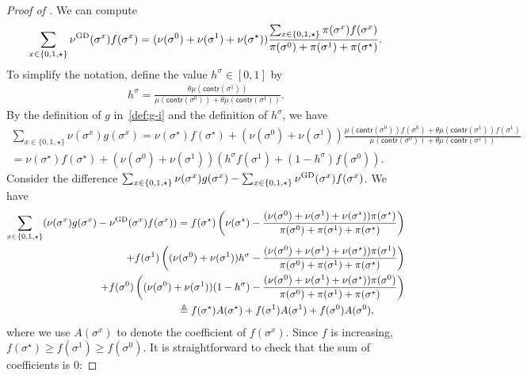 \documentclass[11pt,a4paper]{article}
\theoremstyle{definition}
\newcommand{\defeq}{\triangleq}
\newcommand{\nug}{\nu^{\textnormal{GD}}}
\begin{document}
\begin{proof}[Proof of ]
We can compute
\begin{align*}
\sum_{x\in \{0,1,\star\}}\nug(\sigma^x) f(\sigma^x) =(\nu(\sigma^0)+\nu(\sigma^1)+\nu(\sigma^\star))\frac{\sum_{x\in \{0,1,\star\}}\pi(\sigma^x)f(\sigma^x)}{\pi(\sigma^0)+\pi(\sigma^1)+\pi(\sigma^\star)}.
\end{align*}
To simplify the notation, define the value $h^\sigma \in [0,1]$ by
\begin{align}\label{def:h-sigma}
h^\sigma =\frac{ \theta \mu(\textsf{contr}(\sigma^1))}{\mu(\textsf{contr}(\sigma^0))+\theta \mu(\textsf{contr}(\sigma^1))}.  
\end{align}
By the definition of $g$ in~\eqref{def:g-i} and the definition of $h^\sigma$, we have
\begin{align*}
\sum_{x\in \{0,1,\star\}}\nu(\sigma^x) g(\sigma^x)=\nu(\sigma^\star)f(\sigma^\star)+(\nu(\sigma^0)+\nu(\sigma^1))\frac{ \mu(\textsf{contr}(\sigma^0))f(\sigma^0)+\theta \mu(\textsf{contr}(\sigma^1))f(\sigma^1)}{\mu(\textsf{contr}(\sigma^0))+\theta \mu(\textsf{contr}(\sigma^1))}\\
=\nu(\sigma^\star)f(\sigma^\star)+(\nu(\sigma^0)+\nu(\sigma^1))\left(h^\sigma f(\sigma^1)+(1-h^\sigma )f(\sigma^0)\right).
\end{align*}
Consider the difference $\sum_{x\in \{0,1,\star\}}\nu(\sigma^x) g(\sigma^x)-\sum_{x\in \{0,1,\star\}}\nug(\sigma^x) f(\sigma^x)$. We have
\begin{align*}
\sum_{x\in \{0,1,\star\}}(\nu(\sigma^x) g(\sigma^x)-\nug(\sigma^x) f(\sigma^x))=f(\sigma^\star)\left(\nu(\sigma^\star)-\frac{(\nu(\sigma^0)+\nu(\sigma^1)+\nu(\sigma^\star))\pi(\sigma^\star)}{\pi(\sigma^0)+\pi(\sigma^1)+\pi(\sigma^\star)}\right)\\
\qquad\qquad\qquad\qquad+f(\sigma^1)\left((\nu(\sigma^0)+\nu(\sigma^1))h^\sigma -\frac{(\nu(\sigma^0)+\nu(\sigma^1)+\nu(\sigma^\star))\pi(\sigma^1)}{\pi(\sigma^0)+\pi(\sigma^1)+\pi(\sigma^\star)}\right)\\
\qquad\qquad\qquad+f(\sigma^0)\left((\nu(\sigma^0)+\nu(\sigma^1))(1-h^\sigma )-\frac{(\nu(\sigma^0)+\nu(\sigma^1)+\nu(\sigma^\star))\pi(\sigma^0)}{\pi(\sigma^0)+\pi(\sigma^1)+\pi(\sigma^\star)}\right)\\
\defeq f(\sigma^\star)A(\sigma^\star) + f(\sigma^1)A(\sigma^1) + f(\sigma^0)A(\sigma^0),\quad\qquad
\end{align*}
where we use $A(\sigma^x)$ to denote the coefficient of $f(\sigma^x)$.
Since $f$ is increasing, $f(\sigma^\star)\geq f(\sigma^1)\geq f(\sigma^0)$. 
It is straightforward to check that the sum of coefficients is 0:

\end{proof}
\end{document}
